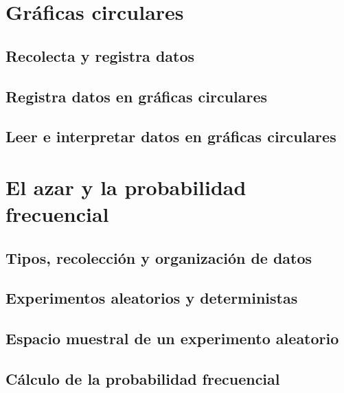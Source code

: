 \documentclass[11pt]{book}
\begin{document}
\newpage \thispagestyle{plain}
\section{Gráficas circulares}
\subsection{Recolecta y registra datos}
\subsection{Registra datos en gráficas circulares}
\subsection{Leer e interpretar datos en gráficas circulares}

\newpage \thispagestyle{plain}
\section{El azar y la probabilidad frecuencial}
\subsection{Tipos, recolección y organización de datos}
\subsection{Experimentos aleatorios y deterministas}
\subsection{Espacio muestral de un experimento aleatorio}
\subsection{Cálculo de la probabilidad frecuencial}
\end{document}
